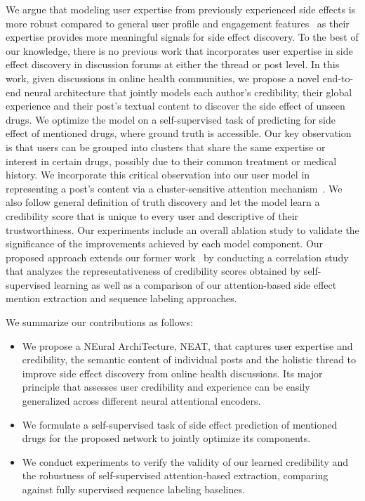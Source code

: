 \documentclass{bmcart}
\begin{document}
We argue that modeling user expertise from previously experienced side effects is more robust compared to general user profile and engagement features~\cite{mukherjee2014people,vydiswaran2019identifying} as their expertise provides more meaningful signals for side effect discovery.
To the best of our knowledge, there is no previous work that incorporates user expertise in side effect discovery in discussion forums at either the thread or post level.
In this work, given discussions in online health communities, we propose a novel end-to-end neural architecture that jointly models each author's credibility, their global experience and their post's textual content to discover the side effect of unseen drugs.
We optimize the model on a self-supervised task of predicting for side effect of mentioned drugs, where ground truth is accessible.
Our key observation is that users can be grouped into clusters 
that share the same expertise or interest in certain drugs, 
possibly due to their common treatment or medical history. 
We incorporate this critical observation into our user model in representing a post's content via a cluster-sensitive attention mechanism~\cite{halder2018cold}.
We also follow general definition of truth discovery and let the
model learn a credibility score that is unique to every user and
descriptive of their trustworthiness.
Our experiments include an overall ablation study to validate the significance of the improvements achieved by each model component. Our proposed approach extends 
our former work~\cite{nguyen-etal-2018-treatment}  
by conducting a correlation study that analyzes the representativeness of 
credibility scores obtained by self-supervised learning  
as well as a comparison of our attention-based side effect mention extraction and sequence labeling approaches.

We summarize our contributions as follows: 
\begin{itemize}
\item We propose a NEural ArchiTecture, NEAT, that captures user expertise and credibility, the semantic content of individual posts and the holistic thread to improve side effect discovery from online health discussions. 
Its major principle that assesses user credibility and experience can be easily generalized across different neural attentional encoders.
\item We formulate a self-supervised task of side effect prediction of mentioned drugs for the proposed network to jointly optimize its components.
\item We conduct experiments to verify the validity of our learned credibility and the robustness of self-supervised attention-based extraction, comparing against fully supervised sequence labeling baselines.
\end{itemize}
\end{document}

